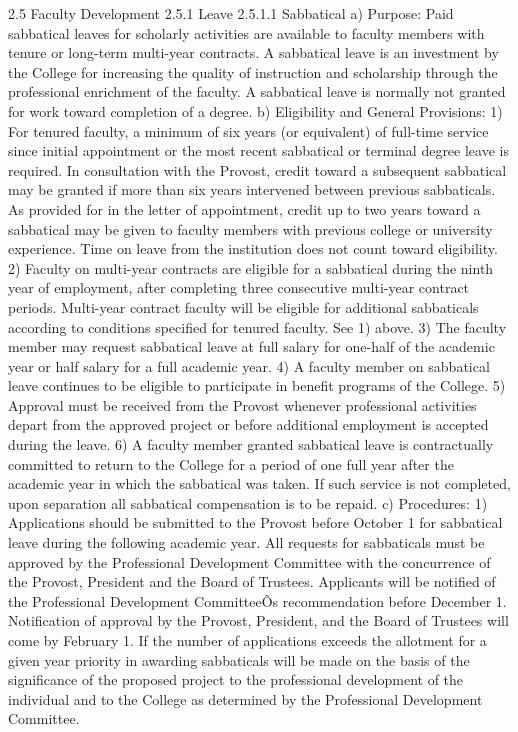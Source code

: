 \documentclass[letterpaper, 11pt]{article}
\begin{document}
2.5 Faculty Development
2.5.1 Leave
2.5.1.1 Sabbatical
a) Purpose: Paid sabbatical leaves for scholarly activities are available to faculty members with tenure or long-term multi-year contracts.  A sabbatical leave is an investment by the College for increasing the quality of instruction and scholarship through the professional enrichment of the faculty.  A sabbatical leave is normally not granted for work toward completion of a degree.
b) Eligibility and General Provisions:
1) For tenured faculty, a minimum of six years (or equivalent) of full-time service since initial appointment or the most recent sabbatical or terminal degree leave is required.  In consultation with the Provost, credit toward a subsequent sabbatical may be granted if more than six years intervened between previous sabbaticals.  As provided for in the letter of appointment, credit up to two years toward a sabbatical may be given to faculty members with previous college or university experience.  Time on leave from the institution does not count toward eligibility.
2) Faculty on multi-year contracts are eligible for a sabbatical during the ninth year of employment, after completing three consecutive multi-year contract periods.  Multi-year contract faculty will be eligible for additional sabbaticals according to conditions specified for tenured faculty.  See 1) above.
3) The faculty member may request sabbatical leave at full salary for one-half of the academic year or half salary for a full academic year.
4) A faculty member on sabbatical leave continues to be eligible to participate in benefit programs of the College.
5) Approval must be received from the Provost whenever professional activities depart from the approved project or before additional employment is accepted during the leave.
6) A faculty member granted sabbatical leave is contractually committed to return to the College for a period of one full year after the academic year in which the sabbatical was taken.  If such service is not completed, upon separation all sabbatical compensation is to be repaid.
c) Procedures:
1) Applications should be submitted to the Provost before October 1 for sabbatical leave during the following academic year.  All requests for sabbaticals must be approved by the Professional Development Committee with the concurrence of the Provost, President and the Board of Trustees.  Applicants will be notified of the Professional Development CommitteeÕs recommendation before December 1.  Notification of approval by the Provost, President, and the Board of Trustees will come by February 1. If the number of applications exceeds the allotment for a given year priority in awarding sabbaticals will be made on the basis of the significance of the proposed project to the professional development of the individual and to the College as determined by the Professional Development Committee.
\end{document}
